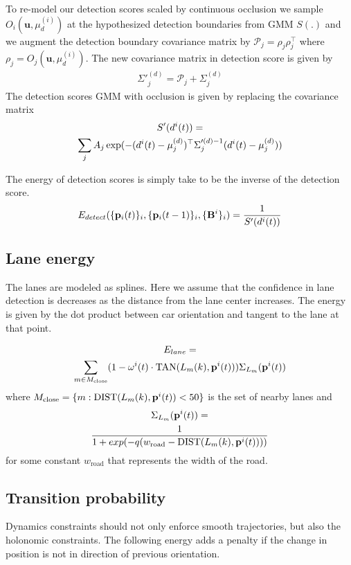 To re-model our detection scores scaled by continuous occlusion we sample
$O_{i}(\mathbf{u}, \mu^{(i)}_d)$ at the hypothesized detection boundaries from
GMM $S(.)$ and we augment the detection boundary covariance matrix by
$\mathcal{P}_{j} = \rho_{j}\rho_{j}^\top$ where $\rho_{j} = O_{j}(\mathbf{u},
\mu^{(i)}_d)$. The new covariance matrix in detection score is given by 
%
\begin{align}
  \Sigma'^{(d)}_j = \mathcal{P}_{j} + \Sigma^{(d)}_j
\end{align}
%
The detection scores GMM with occlusion is given by replacing the covariance
matrix
%
\begin{multline}
  S'(d^{i}(t)) =\\
  \sum_j A_j \exp(-(d^{i}(t)-\mu^{(d)}_j)^\top \Sigma'^{(d)-1}_j
  (d^{i}(t)-\mu^{(d)}_j))
\end{multline}

The energy of detection scores is simply take to be the inverse of the detection score.
\begin{align}
  E_{detect}(\{ \mathbf{p}_{i}({t}) \}_i, \{ \mathbf{p}_{i}({t-1}) \}_i, \{\mathbf{B}^{i}\}_i ) = \frac{1}{S'(d^{i}(t))}
\end{align}

\subsection{Lane energy}
\label{sec:laneEnergy}
 The lanes are modeled as splines. Here we assume that the confidence in lane
 detection is decreases as the distance from the lane center increases.  The
 energy is given by the dot product between car orientation and tangent to the
 lane at that point.

\begin{multline}
  \label{eq:laneOrientationEnergy}
  E_{lane} = \\
  \sum_{m \in M_{\text{close}}}
  (1 - \mathbf{\omega}^{i}(t) \cdot \text{TAN}(L_{m}(k), \mathbf{p}^{i}({t})) )
\Sigma_{L_m}(\mathbf{p}^{i}({t}))
\end{multline}
where $M_{\text{close}} = \{m : \text{DIST}(L_{m}(k), \mathbf{p}^{i}({t})) < 50\} $ is
the set of nearby lanes and 
\begin{multline}
\Sigma_{L_m}(\mathbf{p}^{i}({t})) = \\
  \frac{1}{1 + exp(-q(w_{\text{road}} - \text{DIST}(L_{m}(k), \mathbf{p}^{i}({t}))))}
\end{multline}
for some constant $w_{\text{road}}$ that represents the width of the road.

\subsection{Transition probability}
Dynamics constraints should not only enforce smooth trajectories, but also the
holonomic constraints.  The following energy adds a penalty if the change in
position is not in direction of previous orientation.


